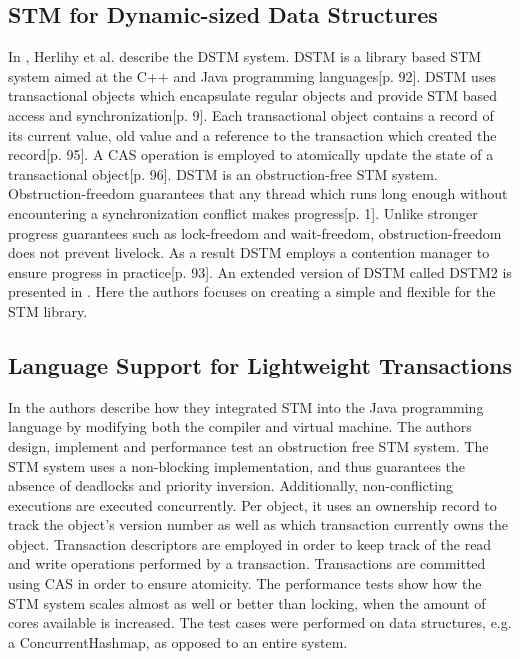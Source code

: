 \subsection{\ac{STM} for Dynamic-sized Data Structures}
In \cite{herlihy2003software}, Herlihy et al. describe the \ac{DSTM} system. \ac{DSTM} is a library based \ac{STM} system aimed at the C++ and Java programming languages\cite{herlihy2003software}[p. 92]. \ac{DSTM} uses transactional objects which encapsulate regular objects and provide \ac{STM} based access and synchronization\cite{herlihy2003software}[p. 9]. Each transactional object contains a record of its current value, old value and a reference to the transaction which created the record\cite{herlihy2003software}[p. 95]. A \ac{CAS} operation is employed to atomically update the state of a transactional object\cite{herlihy2003software}[p. 96]. \ac{DSTM} is an obstruction-free\cite{herlihy2003obstruction} \ac{STM} system. Obstruction-freedom guarantees that any thread which runs long enough without encountering a synchronization conflict makes progress\cite{herlihy2003obstruction}[p. 1]. Unlike stronger progress guarantees such as lock-freedom and wait-freedom, obstruction-freedom does not prevent livelock\cite[p. 47]{harris2010transactional}. As a result \ac{DSTM} employs a contention manager to ensure progress in practice\cite{herlihy2003software}[p. 93]. An extended version of \ac{DSTM} called DSTM2 is presented in \cite{herlihy2006flexible}. Here the authors focuses on creating a simple and flexible  for the \ac{STM} library.

\subsection{Language Support for Lightweight Transactions}
In \cite{harris2003language} the authors describe how they integrated \ac{STM} into the Java programming language by modifying both the compiler\cite[p. 4]{harris2003language} and virtual machine\cite[p. 9]{harris2003language}. The authors design, implement and performance test an obstruction free \ac{STM} system. The \ac{STM} system uses a non-blocking implementation, and thus guarantees the absence of deadlocks and priority inversion. Additionally, non-conflicting executions are executed concurrently. Per object, it uses an ownership record to track the object's version number as well as which transaction currently owns the object\cite[p. 6]{harris2003language}. Transaction descriptors are employed in order to keep track of the read and write operations performed by a transaction. Transactions are committed  using \ac{CAS} in order to ensure atomicity\cite[p. 7]{harris2003language}. The performance tests show how the \ac{STM} system scales almost as well or better than locking, when the amount of cores available is increased\cite[p. 12]{harris2003language}. The test cases were performed on data structures, e.g. a ConcurrentHashmap, as opposed to an entire system.

